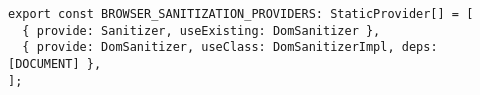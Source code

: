 \begin{verbatim}
export const BROWSER_SANITIZATION_PROVIDERS: StaticProvider[] = [
  { provide: Sanitizer, useExisting: DomSanitizer },
  { provide: DomSanitizer, useClass: DomSanitizerImpl, deps: [DOCUMENT] },
];
\end{verbatim}
